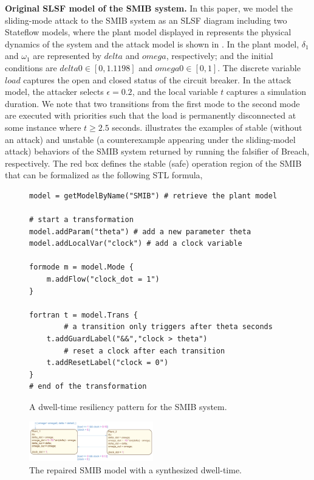 \vspace{0.5em}
\noindent
{\bf Original SLSF model of the SMIB system.} 
In this paper, we model the sliding-mode attack to the SMIB system as an SLSF diagram including two Stateflow models, where the plant model displayed in  represents the physical dynamics of the system and the attack model is shown in . 
%
In the plant model, $\delta_1$ and $\omega_1$ are represented by $delta$ and $omega$, respectively; and the initial conditions are $delta0 \in [0, 1.1198]$ and $omega0 \in [0, 1]$. The discrete variable $load$ captures the open and closed status of the circuit breaker.
%
In the attack model, the attacker selects $\epsilon = 0.2$, and the local variable $t$ captures a simulation duration. We note that two transitions from the first mode to the second mode are executed with priorities such that the load is permanently disconnected at some instance where $t \geq 2.5$ seconds. 
%
%
 illustrates the examples of stable (\ie without an attack) and unstable (\ie a counterexample appearing under the sliding-model attack) behaviors of the SMIB system returned by running the falsifier of Breach, respectively. The red box defines the stable (safe) operation region of the SMIB that can be formalized as the following STL formula, 
%
\begin{figure}[!t]%
\begin{lstlisting}[basicstyle=\ttfamily\footnotesize, numbers=none]
model = getModelByName("SMIB") # retrieve the plant model
	
# start a transformation  
model.addParam("theta") # add a new parameter theta
model.addLocalVar("clock") # add a clock variable
	
formode m = model.Mode {
    m.addFlow("clock_dot = 1")
}

fortran t = model.Trans {
		# a transition only triggers after theta seconds
    t.addGuardLabel("&&","clock > theta") 
		# reset a clock after each transition
    t.addResetLabel("clock = 0") 
}
# end of the transformation
\end{lstlisting}
\caption{A dwell-time resiliency pattern for the SMIB system.}%
%
\end{figure}


\begin{figure}[t!]%
	\centering%
    \includegraphics[width=0.48\textwidth]{image/smib_plant_model_res}%
	\caption{The repaired SMIB model with a synthesized dwell-time.}%
\end{figure}%

